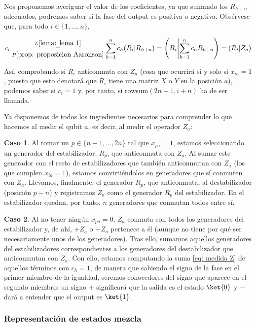 \documentclass[11pt,a4paper,twoside,pdf]{article}
\numberwithin{equation}{section}
\begin{document}
		Nos proponemos averiguar el valor de los coeficientes, ya que sumando los $R_{h+n}$ adecuados, podremos saber si la fase del output es positiva o negativa. Obsérvese que, para todo $i \in \{1,...,n\}$,
		
			\begin{equation}
				c_i \underset{P\ref{prop: proposicion Aaronson}}{\overset{L\ref{lema: lema 1}}{=}}
					\displaystyle\sum_{h=1}^n c_h ( R_i | R_{h+n} ) =
					\left( R_i \, \vline \displaystyle\sum_{h=1}^n c_h R_{h+n} \right) = (R_i|Z_a)
			\end{equation}
		
		Así, comprobando si $R_i$ anticonmuta con $Z_a$ (cosa que ocurrirá si y solo si $x_{ia}=1$, puesto que esto denotará que $R_i$ tiene una matriz $X$ o $Y$ en la posición $a$), podemos saber si $c_i=1$ y, por tanto, si rowsum$(2n+1,i+n)$ ha de ser llamada.
		
		Ya disponemos de todos los ingredientes necesarios para comprender lo que hacemos al medir el qubit $a$, es decir, al medir el operador $Z_a$:
		
		\noindent \textbf{Caso 1}. Al tomar un $p\in\{n+1,...,2n\}$ tal que $x_{pa}=1$, estamos seleccionando un generador del estabilizador, $R_p$, que anticonmuta con $Z_a$. Al sumar este generador con el resto de estabilizadores que también anticonmutan con $Z_a$ (los que cumplen $x_{ia}=1$),  estamos convirtiéndolos en generadores que sí conmuten con $Z_a$. Llevamos, finalmente, el generador $R_p$, que anticonmuta, al destabilizador (posición $p-n$) y registramos $Z_a$ como el generador $R_p$ del estabilizador. En el estabilizador quedan, por tanto, $n$ generadores que conmutan todos entre sí.
		
		\noindent \textbf{Caso 2}. Al no tener ningún $x_{pa}=0$, $Z_a$ conmuta con todos los generadores del estabilizador y, de ahí,  $+Z_a$ o $-Z_a$ pertenece a él (aunque no tiene por qué ser necesariamente unos de los generadores). Tras ello, sumamos aquellos generadores del estabilizadores correspondientes a los generadores del destabilizador que anticonmutan con $Z_a$. Con ello, estamos computando la suma \ref{eq: medida Z} de aquellos términos con $c_h=1$, de manera que sabiendo el signo de la fase en el primer miembro de la igualdad, seremos conocedores del signo que aparece en el segundo miembro: un signo $+$ significará que la salida es el estado $\ket{0}$ y $-$ dará a entender que el output es $\ket{1}$.
		
		
		\subsubsection{Representación de estados mezcla}
		
\end{document}
